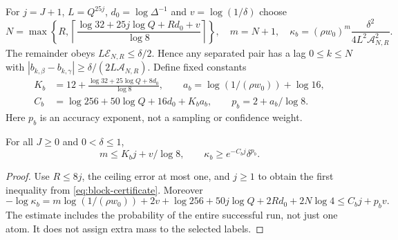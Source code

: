 For $j=J+1$, $L=Q^{25j}$, $d_0=\log\Delta^{-1}$ and $v=\log(1/\delta)$ choose
\begin{equation}
 N=\max\left\{R,\left\lceil
   \frac{\log32+25j\log Q+Rd_0+v}{\log8}\right\rceil\right\},\quad
 m=N+1,
 \quad \kappa_b=(\rho w_0)^m\frac{\delta^2}{4L^2\mathcal A_{N,R}^2}.
 \label{eq:block-certificate}
\end{equation}
The remainder obeys $L\mathcal E_{N,R}\le\delta/2$. Hence any separated pair
has a lag $0\le k\le N$ with
$|b_{k,\beta}-b_{k,\gamma}|\ge\delta/(2L\mathcal A_{N,R})$.
Define fixed constants
\begin{equation}
 \begin{split}
 K_b&=12+\frac{\log32+25\log Q+8d_0}{\log8},\qquad
 a_b=\log(1/(\rho w_0))+\log16,\\
 C_b&=\log256+50\log Q+16d_0+K_b a_b,\qquad
 p_b=2+a_b/\log8.
 \end{split}
 \label{eq:block-constants}
\end{equation}
Here $p_b$ is an accuracy exponent, not a sampling or confidence weight.

\begin{proposition}
\label{prop:block-certificate}
For all $J\ge0$ and $0<\delta\le1$,
\begin{equation}
 m\le K_bj+v/\log8,\qquad \kappa_b\ge e^{-C_bj}\delta^{p_b}.
 \label{eq:block-separation}
\end{equation}
\end{proposition}
\begin{proof}
Use $R\le8j$, the ceiling error at most one, and $j\ge1$ to obtain the first
inequality from \eqref{eq:block-certificate}. Moreover
\[
 -\log\kappa_b=m\log(1/(\rho w_0))+2v+\log256
                     +50j\log Q+2Rd_0+2N\log4
 \le C_bj+p_bv.
\]
The estimate includes the probability of the entire successful run, not just
one atom. It does not assign extra mass to the selected labels.
\end{proof}
